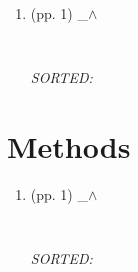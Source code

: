 \documentclass[12pt]{article}
\begin{document}
\begin{enumerate}

\item  (pp. 1)  \_$\wedge$  

	\begin{verbatim}
	
	\end{verbatim}
	\textit{
	SORTED:  
	}
	\\


\end{enumerate}




\section{Methods}


\begin{enumerate}

\item  (pp. 1)  \_$\wedge$  

	\begin{verbatim}
	
	\end{verbatim}
	\textit{
	SORTED:  
	}
	\\


\end{enumerate}
\end{document}
